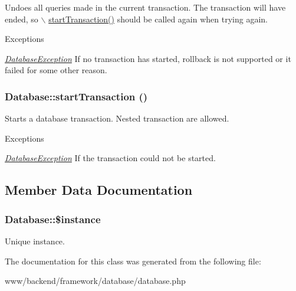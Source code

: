 Undoes all queries made in the current transaction. The transaction will have ended, so $\backslash$ \hyperlink{classDatabase_a4107b10d54447fc4be287c878ff6faa0}{startTransaction()} should be called again when trying again.


\begin{DoxyExceptions}{Exceptions}
\item[{\em \hyperlink{classDatabaseException}{DatabaseException}}]If no transaction has started, rollback is not supported or it failed for some other reason. \end{DoxyExceptions}
\hypertarget{classDatabase_a4107b10d54447fc4be287c878ff6faa0}{
\subsubsection[{startTransaction}]{\setlength{\rightskip}{0pt plus 5cm}Database::startTransaction ()}}
\label{classDatabase_a4107b10d54447fc4be287c878ff6faa0}
Starts a database transaction. Nested transaction are allowed.


\begin{DoxyExceptions}{Exceptions}
\item[{\em \hyperlink{classDatabaseException}{DatabaseException}}]If the transaction could not be started. \end{DoxyExceptions}


\subsection{Member Data Documentation}
\hypertarget{classDatabase_a313173b898c14db2a84f7fd1b14e5fb5}{
\subsubsection[{\$instance}]{\setlength{\rightskip}{0pt plus 5cm}Database::\$instance}}
\label{classDatabase_a313173b898c14db2a84f7fd1b14e5fb5}
Unique instance. 

The documentation for this class was generated from the following file:\begin{DoxyCompactItemize}
\item 
www/backend/framework/database/database.php\end{DoxyCompactItemize}
